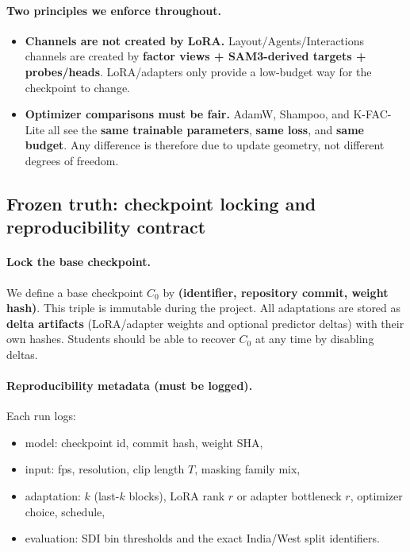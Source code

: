 \paragraph{Two principles we enforce throughout.}
\begin{itemize}[leftmargin=*,itemsep=2pt]
\item \textbf{Channels are not created by LoRA.} Layout/Agents/Interactions channels are created by \textbf{factor views + SAM3-derived targets + probes/heads}. LoRA/adapters only provide a low-budget way for the checkpoint to change.
\item \textbf{Optimizer comparisons must be fair.} AdamW, Shampoo, and K-FAC-Lite all see the \textbf{same trainable parameters}, \textbf{same loss}, and \textbf{same budget}. Any difference is therefore due to update geometry, not different degrees of freedom.
\end{itemize}

\subsection{Frozen truth: checkpoint locking and reproducibility contract}
\label{sec:checkpoint_locking_contract}

\paragraph{Lock the base checkpoint.}
We define a base checkpoint $C_0$ by \textbf{(identifier, repository commit, weight hash)}. This triple is immutable during the project. All adaptations are stored as \textbf{delta artifacts} (LoRA/adapter weights and optional predictor deltas) with their own hashes. Students should be able to recover $C_0$ at any time by disabling deltas.

\paragraph{Reproducibility metadata (must be logged).}
Each run logs:
\begin{itemize}[leftmargin=*,itemsep=2pt]
\item model: checkpoint id, commit hash, weight SHA,
\item input: fps, resolution, clip length $T$, masking family mix,
\item adaptation: $k$ (last-$k$ blocks), LoRA rank $r$ or adapter bottleneck $r$, optimizer choice, schedule,
\item evaluation: SDI bin thresholds and the exact India/West split identifiers.
\end{itemize}

